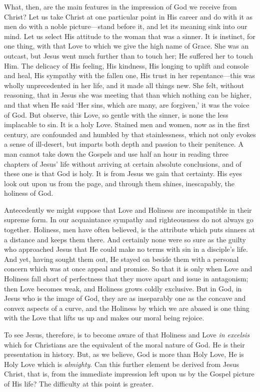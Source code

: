 \documentclass[12pt,a5paper]{article}
\begin{document}
What, then, are the main features in the impression of God we receive from Christ? Let us take Christ at one particular point in His career and do with it as men do with a noble picture---stand before it, and let its meaning sink into our mind. Let us select His attitude to the woman that was a sinner. It is instinct, for one thing, with that Love to which we give the high name of Grace. She was an outcast, but Jesus went much further than to touch her; He suffered her to touch Him. The delicacy of His feeling, His kindness, His longing to uplift and console and heal, His sympathy with the fallen one, His trust in her repentance---this was wholly unprecedented in her life, and it made all things new. She felt, without reasoning, that in Jesus she was meeting that than which nothing can be higher, and that when He said `Her sins, which are many, are forgiven,' it was the voice of God. But observe, this Love, so gentle with the sinner, is none the less implacable to sin. It is a holy Love. Stained men and women, now as in the first century, are confounded and humbled by that stainlessness, which not only evokes a sense of ill-desert, but imparts both depth and passion to their penitence. A man cannot take down the Gospels and use half an hour in reading three chapters of Jesus' life without arriving at certain absolute conclusions, and of these one is that God is holy. It is from Jesus we gain that certainty. His eyes look out upon us from the page, and through them shines, inescapably, the holiness of God.

Antecedently we might suppose that Love and Holiness are incompatible in their supreme form. In our acquaintance sympathy and righteousness do not always go together. Holiness, men have often believed, is the attribute which puts sinners at a distance and keeps them there. And certainly none were so sure as the guilty who approached Jesus that He could make no terms with sin in a disciple's life. And yet, having sought them out, He stayed on beside them with a personal concern which was at once appeal and promise. So that it is only when Love and Holiness fall short of perfectness that they move apart and issue in antagonism; then Love becomes weak, and Holiness grows coldly exclusive. But in God, in Jesus who is the image of God, they are as inseparably one as the concave and convex aspects of a curve, and the Holiness by which we are abased is one thing with the Love that lifts us up and makes our moral being rejoice. 

To see Jesus, therefore, is to become aware of that Holiness and Love \textit{in excelsis} which for Christians are the equivalent of the moral nature of God. He is their presentation in history. But, as we believe, God is more than Holy Love, He is Holy Love which is \textit{almighty}. Can this further element be derived from Jesus Christ, that is, from the immediate impression left upon us by the Gospel picture of His life? The difficulty at this point is greater.
\end{document}
